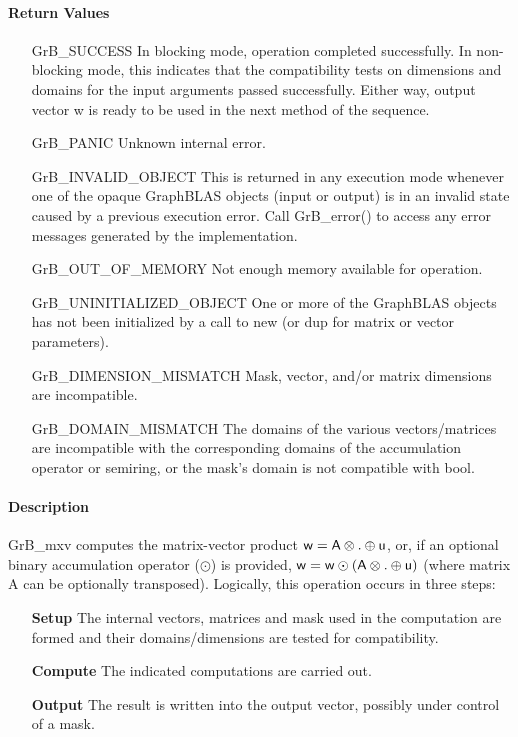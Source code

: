 \paragraph{Return Values}

\begin{itemize}[leftmargin=2.1in]
    \item[{\sf GrB\_SUCCESS}]         In blocking mode, operation
	completed successfully. In non-blocking mode, this indicates
	that the compatibility tests on dimensions and domains for the
	input arguments passed successfully. Either way, output vector
	{\sf w} is ready to be used in the next method of the sequence.

    \item[{\sf GrB\_PANIC}]           Unknown internal error.
    
    \item[{\sf GrB\_INVALID\_OBJECT}] This is returned in any execution mode 
    whenever one of the opaque GraphBLAS objects (input or output) is in an invalid 
    state caused by a previous execution error.  Call {\sf GrB\_error()} to access 
    any error messages generated by the implementation.

    \item[{\sf GrB\_OUT\_OF\_MEMORY}]  Not enough memory available for operation.
    
    \item[{\sf GrB\_UNINITIALIZED\_OBJECT}] One or more of the GraphBLAS objects 
    has not been initialized by a call to {\sf new} (or {\sf dup} for matrix or
    vector parameters).

    \item[{\sf GrB\_DIMENSION\_MISMATCH}] Mask, vector, and/or matrix 
    dimensions are incompatible.

	\item[{\sf GrB\_DOMAIN\_MISMATCH}]    The domains of the various
	vectors/matrices are incompatible with the corresponding domains of the
	accumulation operator or semiring, or the mask's domain is not compatible
    with {\sf bool}.
\end{itemize}

\paragraph{Description}

{\sf GrB\_mxv} computes the matrix-vector product ${\sf w} = {\sf A}
\otimes . \oplus {\sf u}$, or, if an optional binary accumulation
operator ($\odot$) is provided, ${\sf w} = {\sf w} \odot \left({\sf A}
\otimes . \oplus {\sf u}\right)$ (where matrix {\sf A}
 can be optionally transposed).  Logically, this operation
occurs in three steps:
\begin{enumerate}[leftmargin=0.85in]
\item[\bf Setup] The internal vectors, matrices and mask used in the computation are formed and their domains/dimensions are tested for compatibility.
\item[\bf Compute] The indicated computations are carried out.
\item[\bf Output] The result is written into the output vector, possibly under control of a mask.
\end{enumerate}

